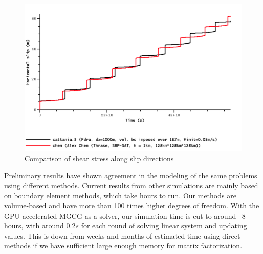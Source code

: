 \begin{figure}
    \centering
    \includegraphics[width=\linewidth]{figures/sample-slip-2.png}
    \caption{Comparison of shear stress along slip directions}
    \label{fig:bp5-slip2}
\end{figure}

Preliminary results have shown agreement in the modeling of the same problems using different methods.
Current results from other simulations are mainly based on boundary element methods, which take hours to run.
Our methods are volume-based and have more than 100 times higher degrees of freedom.
With the GPU-accelerated MGCG as a solver, our simulation time is cut to around ~8 hours, with around $0.2s$ for each round of solving linear system and updating values. 
This is down from weeks and months of estimated time using direct methods if we have sufficient large enough memory for matrix factorization.